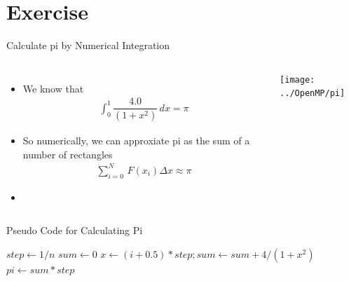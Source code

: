 \documentclass[c,mathserif,compress,xcolor=svgnames]{beamer}
\begin{document}
\section{Exercise}
\begin{frame}[allowframebreaks]{Calculate pi by Numerical Integration}
  \begin{columns}
    \column{5cm}
    \begin{itemize}
      \item We know that
      \begin{align*}
        \int^1_0 \dfrac{4.0}{(1+x^2)}\, dx = \pi
      \end{align*}
      \item So numerically, we can approxiate pi as the sum of a number of rectangles
      \begin{align*}
        \sum^N_{i=0}\,F(x_i)\Delta x \approx \pi
      \end{align*}
      \item[] 
    \end{itemize}
    \column{5cm}
    \begin{center}
      \texttt{[image: ../OpenMP/pi]}
    \end{center}
  \end{columns}

  \begin{algorithm}[H]
    \caption{Pseudo Code for Calculating Pi}
    \begin{algorithmic}
        \State $step \gets 1/n$
        \State $sum \gets 0$
        \State $x \gets (i+0.5)*step; sum \gets sum + 4/(1+x^2)$
        \EndDo
        \State $pi \gets sum * step$
        \EndFunction
    \end{algorithmic}
  \end{algorithm}
\end{frame}
\end{document}
